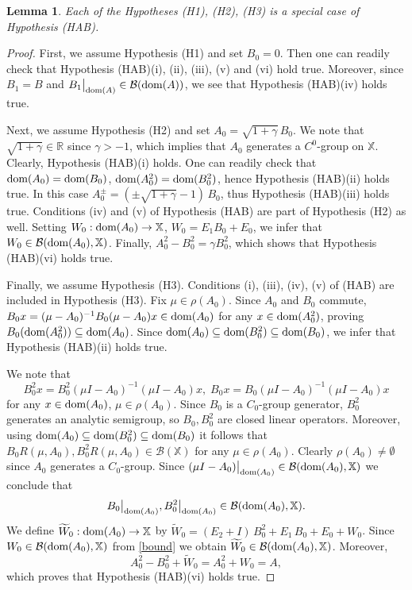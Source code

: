 \documentclass[11pt]{amsart}
\numberwithin{equation}{section}
\newtheorem{lemma}[theorem]{Lemma}
\theoremstyle{remark}
\theoremstyle{definition}
\newcommand\bX{{\mathbb X}}
\newcommand{\dom}{\text{\rm{dom}}}
\begin{document}
\begin{lemma}\label{l8.1}
	Each of the Hypotheses \textnormal{(H1), (H2), (H3)} is a special case of Hypothesis \textnormal{(HAB)}. 
\end{lemma}
\begin{proof}
	First, we assume Hypothesis (H1) and set $B_0 = 0$. Then one can readily check that Hypothesis (HAB)(i), (ii), (iii), (v) and (vi) hold true. Moreover, since $B_1 = B$ and $B_1\big|_{\dom(A)} \in \mathcal{B}(\dom(A))$,
	we see that Hypothesis (HAB)(iv) holds true.
	
	Next, we assume Hypothesis (H2) and set $A_0 = \sqrt{1+\gamma}\, B_0$.  We note that
	$\sqrt{1+\gamma} \in \mathbb{R}$ since $\gamma > -1$, which implies that $A_0$ generates a
	$C^0$-group on $\bX$. Clearly, Hypothesis (HAB)(i) holds. One can readily check that
	$\dom(A_0) = \dom(B_0)$, $\dom(A_0^2) = \dom(B_0^2)$, hence Hypothesis (HAB)(ii) holds true.
	In this case $A_0^\pm = (\pm\sqrt{1+\gamma} - 1)\,B_0$, thus Hypothesis (HAB)(iii) holds true.
	Conditions (iv) and (v) of Hypothesis (HAB) are part of Hypothesis (H2) as well.
	Setting $W_0: \dom(A_0) \to \bX$, $W_0 = E_1 B_0 + E_0$, we infer that
	$W_0 \in \mathcal{B}(\dom(A_0), \bX)$. Finally, $A_0^2 - B_0^2 = \gamma B_0^2$,
	which shows that Hypothesis (HAB)(vi) holds true.
	
	Finally, we assume Hypothesis (H3). Conditions (i), (iii), (iv), (v) of (HAB) are included in Hypothesis (H3).
	Fix $\mu\in\rho(A_0)$. Since $A_0$ and $B_0$ commute, 
	$B_0 x=(\mu-A_0)^{-1}B_0(\mu-A_0)x\in\dom(A_0)$
	for any $x\in\dom(A_0^2)$, proving $B_0(\dom(A_0^2))\subseteq\dom(A_0)$. Since $\dom(A_0) \subseteq \dom(B_0^2) \subseteq \dom(B_0)$,
	we infer that Hypothesis (HAB)(ii) holds true. 
	
	We note that
	\begin{equation}\label{2.4.1}
		B_0^2 x=B_0^2(\mu I-A_0)^{-1}(\mu I-A_0)x,\; B_0 x=B_0(\mu I-A_0)^{-1}(\mu I-A_0)x
	\end{equation}
	for any $x\in\dom(A_0)$, $\mu\in\rho(A_0)$. Since $B_0$ is a $C_0$-group generator, $B_0^2$ generates an analytic semigroup, so $B_0,B_0^2$
	are closed linear operators. Moreover, using  $\dom(A_0)\subseteq\dom(B_0^2)\subseteq\dom(B_0)$ it follows that 
	$B_0 R(\mu,A_0),B_0^2 R(\mu,A_0)\in\mathcal{B}(\bX)$ for any $\mu\in\rho(A_0)$. Clearly $\rho(A_0)\ne\emptyset$ since $A_0$ generates a $C_0$-group. Since $(\mu I-A_0)\big|_{\dom(A_0)}\in\mathcal{B}(\dom(A_0),\bX)$
	we conclude that
	\begin{equation}\label{bound}
		B_0\big|_{\dom(A_0)}, B_0^2\big|_{\dom(A_0)}\in \mathcal{B}(\dom(A_0), \bX).
	\end{equation}
	We define
	$\widetilde{W}_0: \dom(A_0) \to \bX$ by
	$
	\widetilde{W}_0 = (E_2 + I)\,B_0^2 + E_1\,B_0 + E_0 + W_0$. Since $W_0 \in \mathcal{B}(\dom(A_0), \bX)$ from \eqref{bound}
	we obtain $\widetilde{W}_0 \in \mathcal{B}(\dom(A_0), \bX)$. Moreover,
	\begin{equation}\label{rep-A}
		A_0^2 - B_0^2 + \widetilde{W}_0 = A_0^2 + W_0 = A,
	\end{equation}
	which proves that Hypothesis (HAB)(vi) holds true.
\end{proof}
\end{document}
